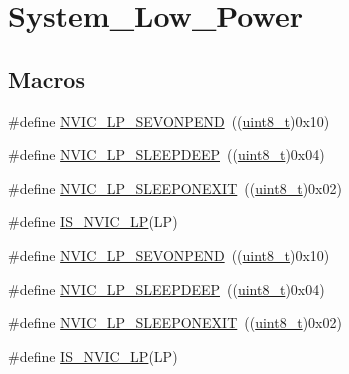 \hypertarget{group___system___low___power}{}\section{System\+\_\+\+Low\+\_\+\+Power}
\label{group___system___low___power}
\subsection*{Macros}
\begin{DoxyCompactItemize}
\item 
\#define \hyperlink{group___system___low___power_ga10748d2b2875afd122f6476864ad6cae}{N\+V\+I\+C\+\_\+\+L\+P\+\_\+\+S\+E\+V\+O\+N\+P\+E\+ND}~((\hyperlink{_p_e___types_8h_aba7bc1797add20fe3efdf37ced1182c5}{uint8\+\_\+t})0x10)
\item 
\#define \hyperlink{group___system___low___power_gaeec2d10922fa9ec5e65398667b303253}{N\+V\+I\+C\+\_\+\+L\+P\+\_\+\+S\+L\+E\+E\+P\+D\+E\+EP}~((\hyperlink{_p_e___types_8h_aba7bc1797add20fe3efdf37ced1182c5}{uint8\+\_\+t})0x04)
\item 
\#define \hyperlink{group___system___low___power_ga368dc13a9c762a307c07cfa2e3ef59ad}{N\+V\+I\+C\+\_\+\+L\+P\+\_\+\+S\+L\+E\+E\+P\+O\+N\+E\+X\+IT}~((\hyperlink{_p_e___types_8h_aba7bc1797add20fe3efdf37ced1182c5}{uint8\+\_\+t})0x02)
\item 
\#define \hyperlink{group___system___low___power_ga985896f03bc1d7b3da17a212f1bc3de9}{I\+S\+\_\+\+N\+V\+I\+C\+\_\+\+LP}(LP)
\item 
\#define \hyperlink{group___system___low___power_ga10748d2b2875afd122f6476864ad6cae}{N\+V\+I\+C\+\_\+\+L\+P\+\_\+\+S\+E\+V\+O\+N\+P\+E\+ND}~((\hyperlink{_p_e___types_8h_aba7bc1797add20fe3efdf37ced1182c5}{uint8\+\_\+t})0x10)
\item 
\#define \hyperlink{group___system___low___power_gaeec2d10922fa9ec5e65398667b303253}{N\+V\+I\+C\+\_\+\+L\+P\+\_\+\+S\+L\+E\+E\+P\+D\+E\+EP}~((\hyperlink{_p_e___types_8h_aba7bc1797add20fe3efdf37ced1182c5}{uint8\+\_\+t})0x04)
\item 
\#define \hyperlink{group___system___low___power_ga368dc13a9c762a307c07cfa2e3ef59ad}{N\+V\+I\+C\+\_\+\+L\+P\+\_\+\+S\+L\+E\+E\+P\+O\+N\+E\+X\+IT}~((\hyperlink{_p_e___types_8h_aba7bc1797add20fe3efdf37ced1182c5}{uint8\+\_\+t})0x02)
\item 
\#define \hyperlink{group___system___low___power_ga985896f03bc1d7b3da17a212f1bc3de9}{I\+S\+\_\+\+N\+V\+I\+C\+\_\+\+LP}(LP)
\end{DoxyCompactItemize}


